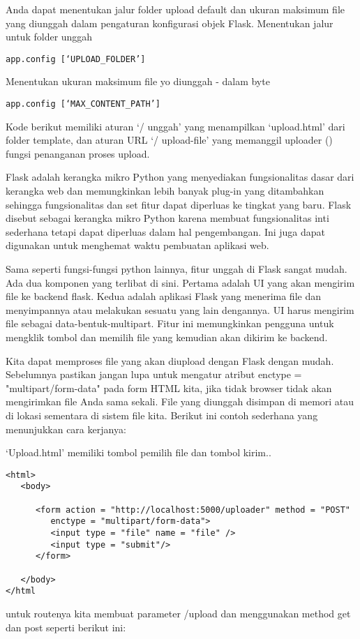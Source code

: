 \documentclass[12pt,a4paper]{article}
\begin{document}
Anda dapat menentukan jalur folder upload default dan ukuran maksimum file yang diunggah dalam pengaturan konfigurasi objek Flask.
Menentukan jalur untuk folder unggah
\begin{verbatim}
app.config [‘UPLOAD_FOLDER’] 
\end{verbatim}
Menentukan ukuran maksimum file yo diunggah - dalam byte
\begin{verbatim}
app.config [‘MAX_CONTENT_PATH’] 
\end{verbatim}
Kode berikut memiliki aturan ‘/ unggah’ yang menampilkan ‘upload.html’ dari folder template, dan aturan URL ‘/ upload-file’ yang memanggil uploader () fungsi penanganan proses upload.

Flask adalah kerangka mikro Python yang menyediakan fungsionalitas dasar dari kerangka web dan memungkinkan lebih banyak plug-in yang ditambahkan sehingga fungsionalitas dan set fitur dapat diperluas ke tingkat yang baru. Flask disebut sebagai kerangka mikro Python karena membuat fungsionalitas inti sederhana tetapi dapat diperluas dalam hal pengembangan. Ini juga dapat digunakan untuk menghemat waktu pembuatan aplikasi web.

Sama seperti fungsi-fungsi python lainnya, fitur unggah di Flask sangat mudah. Ada dua komponen yang terlibat di sini. Pertama adalah UI yang akan mengirim file ke backend flask. Kedua adalah aplikasi Flask yang menerima file dan menyimpannya atau melakukan sesuatu yang lain dengannya. UI harus mengirim file sebagai data-bentuk-multipart. Fitur ini memungkinkan pengguna untuk mengklik tombol dan memilih file yang kemudian akan dikirim ke backend.

Kita dapat memproses file yang akan diupload dengan Flask dengan mudah. Sebelumnya pastikan jangan lupa untuk mengatur atribut enctype = "multipart/form-data" pada form HTML kita, jika tidak browser tidak akan mengirimkan file Anda sama sekali. File yang diunggah disimpan di memori atau di lokasi sementara di sistem file kita. Berikut ini contoh sederhana yang menunjukkan cara kerjanya:

‘Upload.html’ memiliki tombol pemilih file dan tombol kirim..
\begin{verbatim}
<html>
   <body>
   
      <form action = "http://localhost:5000/uploader" method = "POST" 
         enctype = "multipart/form-data">
         <input type = "file" name = "file" />
         <input type = "submit"/>
      </form>
      
   </body>
</html
\end{verbatim}
untuk routenya kita membuat parameter /upload dan menggunakan method get dan post seperti berikut ini:
\end{document}
